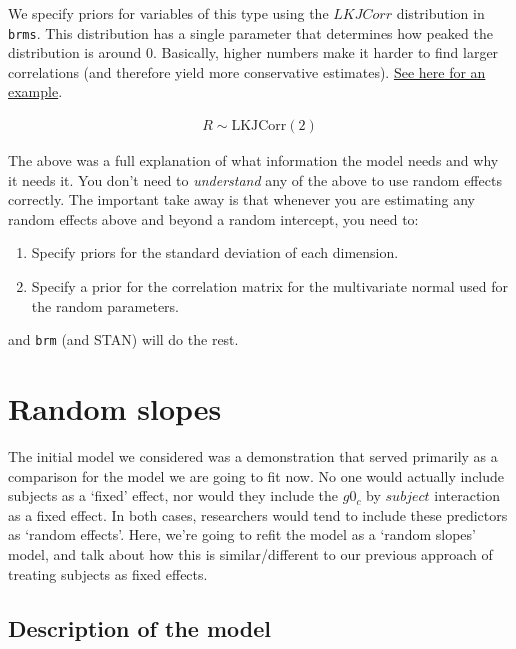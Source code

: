 \documentclass[
]{book}
\begin{document}
We specify priors for variables of this type using the \(LKJCorr\) distribution in \texttt{brms}. This distribution has a single parameter that determines how peaked the distribution is around 0. Basically, higher numbers make it harder to find larger correlations (and therefore yield more conservative estimates). \href{https://eager-roentgen-523c83.netlify.app/2014/12/27/d-lkj-priors/}{See here for an example}.

\begin{equation}
\begin{split}
R \sim \mathrm{LKJCorr} (2)
\end{split}
\label{eq:672}
\end{equation}

The above was a full explanation of what information the model needs and why it needs it. You don't need to \emph{understand} any of the above to use random effects correctly. The important take away is that whenever you are estimating any random effects above and beyond a random intercept, you need to:

\begin{enumerate}
\def\labelenumi{\arabic{enumi})}
\item
  Specify priors for the standard deviation of each dimension.
\item
  Specify a prior for the correlation matrix for the multivariate normal used for the random parameters.
\end{enumerate}

and \texttt{brm} (and STAN) will do the rest.

\hypertarget{random-slopes}{%
\section{Random slopes}\label{random-slopes}}

The initial model we considered was a demonstration that served primarily as a comparison for the model we are going to fit now. No one would actually include subjects as a `fixed' effect, nor would they include the \(g0_c\) by \(subject\) interaction as a fixed effect. In both cases, researchers would tend to include these predictors as `random effects'. Here, we're going to refit the model as a `random slopes' model, and talk about how this is similar/different to our previous approach of treating subjects as fixed effects.

\hypertarget{description-of-the-model-8}{%
\subsection{Description of the model}\label{description-of-the-model-8}}
\end{document}
